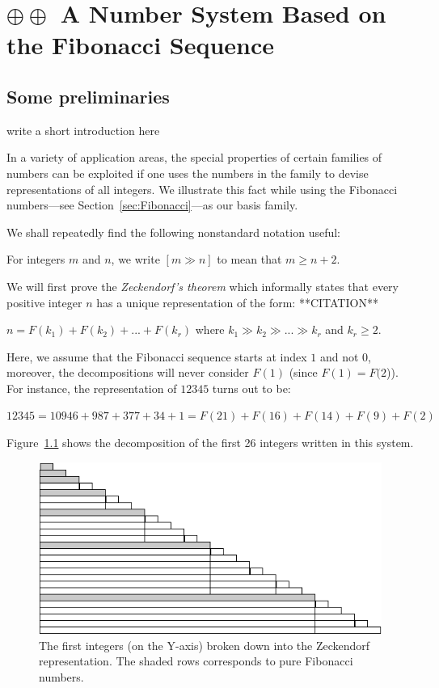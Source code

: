 
\chapter{$\oplus \oplus$ A Number System Based on the Fibonacci Sequence}
\label{sec:numerals-special-families}
\label{sec:Fibo-numbers}


\section{Some preliminaries}
{\Denis write a short introduction here}

In a variety of application areas, the special properties of certain
families of numbers can be exploited if one uses the numbers in the
family to devise representations of all integers.  We illustrate this
fact while using the Fibonacci numbers---see
Section~\ref{sec:Fibonacci}---as our basis family.

We shall repeatedly find the following nonstandard notation useful:

For integers $m$ and $n$, we write $[m \gg n]$ to mean that $m \geq
n+2$.

\medskip


We will first prove the \textit{Zeckendorf's theorem} which informally states
that every positive integer $n$ has a unique representation of the
form:  **CITATION**

$n = F(k_1) + F(k_2) + ... + F(k_r)$ where $k_1 \gg k_2 \gg ... \gg k_r$ and $k_r \geq 2$.

Here, we assume that the Fibonacci sequence starts at index $1$ and not $0$,
moreover, the decompositions will never consider $F(1)$ (since $F(1)=F(2$)). 
For instance, the representation of $12345$ turns out to be:

$12345 = 10946 + 987 + 377 + 34 + 1 = F(21) + F(16) + F(14) + F(9) + F(2)$
\bigskip

Figure~\ref{zeckendorf} shows the decomposition of the first 26 integers written in this system. 
\begin{figure}[h]
\begin{center}
        \includegraphics[scale=0.6]{FiguresArithmetic/Zeckendorf}
        \caption{The first integers (on the Y-axis) broken down into the Zeckendorf representation.
        The shaded rows corresponds to pure Fibonacci numbers.}
\label{zeckendorf}
\end{center}
\end{figure}

